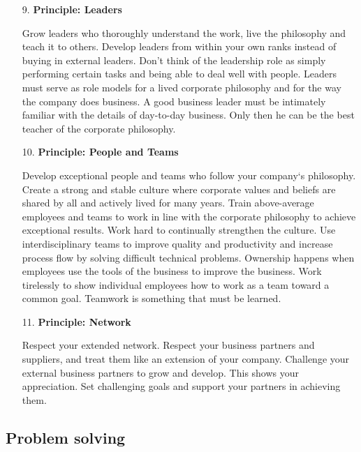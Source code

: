 \documentclass[11pt,a4paper]{article}
\begin{document}
\begin{enumerate}
\item[9.] \textbf{Principle: Leaders}
  
  Grow leaders who thoroughly understand the work, live the philosophy and
  teach it to others. Develop leaders from within your own ranks instead of
  buying in external leaders. Don't think of the leadership role as simply
  performing certain tasks and being able to deal well with people. Leaders
  must serve as role models for a lived corporate philosophy and for the way
  the company does business. A good business leader must be intimately
  familiar with the details of day-to-day business. Only then he can be the
  best teacher of the corporate philosophy.

\item[10.] \textbf{Principle: People and Teams}
  
  Develop exceptional people and teams who follow your company‘s philosophy.
  Create a strong and stable culture where corporate values and beliefs are
  shared by all and actively lived for many years. Train above-average
  employees and teams to work in line with the corporate philosophy to achieve
  exceptional results. Work hard to continually strengthen the culture. Use
  interdisciplinary teams to improve quality and productivity and increase
  process flow by solving difficult technical problems. Ownership happens when
  employees use the tools of the business to improve the business. Work
  tirelessly to show individual employees how to work as a team toward a
  common goal. Teamwork is something that must be learned.

\item[11.] \textbf{Principle: Network}
  
  Respect your extended network. Respect your business partners and suppliers,
  and treat them like an extension of your company.  Challenge your external
  business partners to grow and develop. This shows your appreciation. Set
  challenging goals and support your partners in achieving them.
\end{enumerate}

\subsection{Problem solving}
\end{document}
